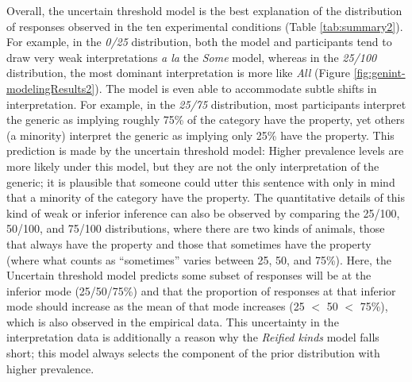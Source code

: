 \documentclass[floatsintext,doc]{apa6}
\begin{document}
Overall, the uncertain threshold model is the best explanation of the distribution of responses observed in the ten experimental conditions (Table \ref{tab:summary2}). 
For example, in the \emph{0/25} distribution, both the model and participants tend to draw very weak interpretations \emph{a la} the \emph{Some} model, whereas in the \emph{25/100} distribution, the most dominant interpretation is more like \emph{All} (Figure \ref{fig:genint-modelingResults2}).
The model is even able to accommodate subtle shifts in interpretation.
For example, in the \emph{25/75} distribution, most participants interpret the generic as implying roughly 75\% of the category have the property, yet others (a minority) interpret the generic as implying only 25\% have the property. 
This prediction is made by the uncertain threshold model: Higher prevalence levels are more likely under this model, but they are not the only interpretation of the generic; it is plausible that someone could utter this sentence with only in mind that a minority of the category have the property. 
The quantitative details of this kind of weak or inferior inference can also be observed by comparing the 25/100, 50/100, and 75/100 distributions, where there are two kinds of animals, those that always have the property and those that sometimes have the property (where what counts as ``sometimes'' varies between 25, 50, and 75\%). 
Here, the Uncertain threshold model predicts some subset of responses will be at the inferior mode (25/50/75\%) and that the proportion of responses at that inferior mode should increase as the mean of that mode increases (25 $<$ 50 $<$ 75\%), which is also observed in the empirical data. 
This uncertainty in the interpretation data is additionally a reason why the \emph{Reified kinds} model falls short; this model always selects the component of the prior distribution with higher prevalence. 

\end{document}
